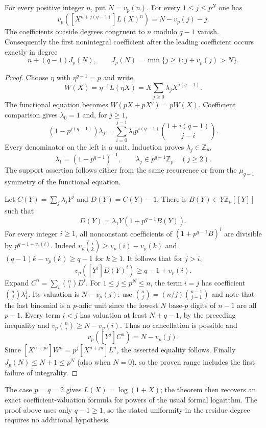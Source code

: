 \begin{theorem}\label{th:log-window}
For every positive integer $n$, put $N=v_p(n)$.  For every
$1\le j\le p^N$ one has
\[
 \boxed{\quad
 v_p\!\left([X^{n+j(q-1)}]L(X)^n\right)
       =N-v_p(j)-j.\quad}
\]
The coefficients outside degrees congruent to $n$ modulo $q-1$ vanish.
Consequently the first nonintegral coefficient after the leading coefficient
occurs exactly in degree
\[
 n+(q-1)J_p(N),\qquad
 J_p(N)=\min\{j\ge1:j+v_p(j)>N\}.
\]
\end{theorem}
\begin{proof}
Choose $\eta$ with $\eta^{q-1}=p$ and write
\[
 W(X)=\eta^{-1}L(\eta X)
     =X\sum_{j\ge0}\lambda_j X^{j(q-1)}.
\]
The functional equation becomes $W(pX+pX^q)=pW(X)$.
Coefficient comparison gives $\lambda_0=1$ and, for $j\ge1$,
\[
 (1-p^{j(q-1)})\lambda_j
   =\sum_{i=0}^{j-1}\lambda_i p^{i(q-1)}
         \binom{1+i(q-1)}{j-i}.
\]
Every denominator on the left is a unit.  Induction proves
$\lambda_j\in\mathbb Z_p$,
\[
 \lambda_1=(1-p^{q-1})^{-1},\qquad
 \lambda_j\in p^{q-1}\mathbb Z_p\quad(j\ge2).
\]
The support assertion follows either from the same recurrence or from the
$\mu_{q-1}$ symmetry of the functional equation.

Let $C(Y)=\sum_j\lambda_jY^j$ and $D(Y)=C(Y)-1$.  There is
$B(Y)\in Y\mathbb Z_p[[Y]]$ such that
\[
 D(Y)=\lambda_1Y(1+p^{q-1}B(Y)).
\]
For every integer $i\ge1$, all nonconstant coefficients of
$(1+p^{q-1}B)^i$ are divisible by $p^{q-1+v_p(i)}$.
Indeed
$v_p\binom{i}{k}\ge v_p(i)-v_p(k)$ and
$(q-1)k-v_p(k)\ge q-1$ for $k\ge1$.
It follows that for $j>i$,
\[
 v_p([Y^j]D(Y)^i)\ge q-1+v_p(i).
\]
Expand $C^n=\sum_i\binom niD^i$.  For $1\le j\le p^N\le n$,
the term $i=j$ has coefficient $\binom nj\lambda_1^j$.  Its valuation is
$N-v_p(j)$: use
$\binom nj=(n/j)\binom{n-1}{j-1}$ and note that the last binomial is a
$p$-adic unit since the lowest $N$ base-$p$ digits of $n-1$ are all $p-1$.
Every term $i<j$ has valuation at least $N+q-1$, by the preceding inequality
and $v_p\binom ni\ge N-v_p(i)$.  Thus no cancellation is possible and
\[
 v_p([Y^j]C^n)=N-v_p(j).
\]
Since $[X^{n+ja}]W^n=p^j[X^{n+ja}]L^n$, the asserted equality follows.
Finally $J_p(N)\le N+1\le p^N$ (also when $N=0$), so the proven range includes
the first failure of integrality.
\end{proof}

The case $p=q=2$ gives $L(X)=\log(1+X)$; the theorem then recovers an
exact coefficient-valuation formula for powers of the usual formal
logarithm.  The proof above uses only $q-1\ge1$, so the stated uniformity
in the residue degree requires no additional hypothesis.

